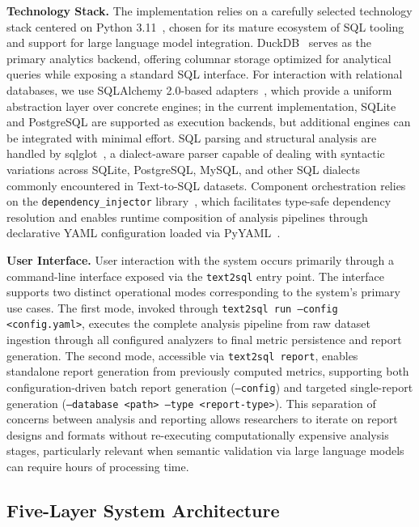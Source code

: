 \documentclass[print]{einformatica}
\begin{document}
\textbf{Technology Stack.} The implementation relies on a carefully selected technology stack centered on Python 3.11~\cite{pythonDocs311}, chosen for its mature ecosystem of SQL tooling and support for large language model integration. DuckDB~\cite{duckdbDocs} serves as the primary analytics backend, offering columnar storage optimized for analytical queries while exposing a standard SQL interface. For interaction with relational databases, we use SQLAlchemy 2.0-based adapters~\cite{sqlalchemyDocs20}, which provide a uniform abstraction layer over concrete engines; in the current implementation, SQLite and PostgreSQL are supported as execution backends, but additional engines can be integrated with minimal effort. SQL parsing and structural analysis are handled by sqlglot~\cite{sqlglotRepo}, a dialect-aware parser capable of dealing with syntactic variations across SQLite, PostgreSQL, MySQL, and other SQL dialects commonly encountered in Text-to-SQL datasets. Component orchestration relies on the \texttt{dependency\_injector} library~\cite{dependencyInjectorDocs}, which facilitates type-safe dependency resolution and enables runtime composition of analysis pipelines through declarative YAML configuration loaded via PyYAML~\cite{pyyaml}. 

\textbf{User Interface.} User interaction with the system occurs primarily through a command-line interface exposed via the \texttt{text2sql} entry point. The interface supports two distinct operational modes corresponding to the system's primary use cases. The first mode, invoked through \texttt{text2sql run --config <config.yaml>}, executes the complete analysis pipeline from raw dataset ingestion through all configured analyzers to final metric persistence and report generation. The second mode, accessible via \texttt{text2sql report}, enables standalone report generation from previously computed metrics, supporting both configuration-driven batch report generation (\texttt{--config}) and targeted single-report generation (\texttt{--database <path> --type <report-type>}). This separation of concerns between analysis and reporting allows researchers to iterate on report designs and formats without re-executing computationally expensive analysis stages, particularly relevant when semantic validation via large language models can require hours of processing time.

\subsection{Five-Layer System Architecture}
\end{document}
